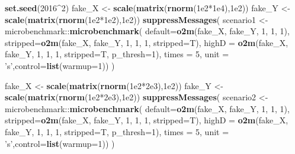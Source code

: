 \documentclass[]{article}
\newenvironment{Shaded}{\begin{snugshade}}{\end{snugshade}}
\newcommand{\KeywordTok}[1]{\textcolor[rgb]{0.13,0.29,0.53}{\textbf{{#1}}}}
\newcommand{\DataTypeTok}[1]{\textcolor[rgb]{0.13,0.29,0.53}{{#1}}}
\newcommand{\DecValTok}[1]{\textcolor[rgb]{0.00,0.00,0.81}{{#1}}}
\newcommand{\FloatTok}[1]{\textcolor[rgb]{0.00,0.00,0.81}{{#1}}}
\newcommand{\StringTok}[1]{\textcolor[rgb]{0.31,0.60,0.02}{{#1}}}
\newcommand{\NormalTok}[1]{{#1}}
\begin{document}
\begin{Shaded}
\begin{Highlighting}[]
\KeywordTok{set.seed}\NormalTok{(}\DecValTok{2016}\NormalTok{^}\DecValTok{2}\NormalTok{)}
\NormalTok{fake_X <-}\StringTok{ }\KeywordTok{scale}\NormalTok{(}\KeywordTok{matrix}\NormalTok{(}\KeywordTok{rnorm}\NormalTok{(}\FloatTok{1e2}\NormalTok{*}\FloatTok{1e4}\NormalTok{),}\FloatTok{1e2}\NormalTok{))}
\NormalTok{fake_Y <-}\StringTok{ }\KeywordTok{scale}\NormalTok{(}\KeywordTok{matrix}\NormalTok{(}\KeywordTok{rnorm}\NormalTok{(}\FloatTok{1e2}\NormalTok{*}\FloatTok{1e2}\NormalTok{),}\FloatTok{1e2}\NormalTok{))}
\KeywordTok{suppressMessages}\NormalTok{(}
  \NormalTok{scenario1 <-}\StringTok{ }\NormalTok{microbenchmark::}\KeywordTok{microbenchmark}\NormalTok{(}
    \DataTypeTok{default=}\KeywordTok{o2m}\NormalTok{(fake_X, fake_Y, }\DecValTok{1}\NormalTok{, }\DecValTok{1}\NormalTok{, }\DecValTok{1}\NormalTok{),}
    \DataTypeTok{stripped=}\KeywordTok{o2m}\NormalTok{(fake_X, fake_Y, }\DecValTok{1}\NormalTok{, }\DecValTok{1}\NormalTok{, }\DecValTok{1}\NormalTok{, }\DataTypeTok{stripped=}\NormalTok{T),}
    \DataTypeTok{highD =} \KeywordTok{o2m}\NormalTok{(fake_X, fake_Y, }\DecValTok{1}\NormalTok{, }\DecValTok{1}\NormalTok{, }\DecValTok{1}\NormalTok{, }\DataTypeTok{stripped=}\NormalTok{T, }\DataTypeTok{p_thresh=}\DecValTok{1}\NormalTok{),}
    \DataTypeTok{times =} \DecValTok{5}\NormalTok{, }\DataTypeTok{unit =} \StringTok{'s'}\NormalTok{,}\DataTypeTok{control=}\KeywordTok{list}\NormalTok{(}\DataTypeTok{warmup=}\DecValTok{1}\NormalTok{))}
\NormalTok{)}

\NormalTok{fake_X <-}\StringTok{ }\KeywordTok{scale}\NormalTok{(}\KeywordTok{matrix}\NormalTok{(}\KeywordTok{rnorm}\NormalTok{(}\FloatTok{1e2}\NormalTok{*}\FloatTok{2e3}\NormalTok{),}\FloatTok{1e2}\NormalTok{))}
\NormalTok{fake_Y <-}\StringTok{ }\KeywordTok{scale}\NormalTok{(}\KeywordTok{matrix}\NormalTok{(}\KeywordTok{rnorm}\NormalTok{(}\FloatTok{1e2}\NormalTok{*}\FloatTok{2e3}\NormalTok{),}\FloatTok{1e2}\NormalTok{))}
\KeywordTok{suppressMessages}\NormalTok{(}
  \NormalTok{scenario2 <-}\StringTok{ }\NormalTok{microbenchmark::}\KeywordTok{microbenchmark}\NormalTok{(}
    \DataTypeTok{default=}\KeywordTok{o2m}\NormalTok{(fake_X, fake_Y, }\DecValTok{1}\NormalTok{, }\DecValTok{1}\NormalTok{, }\DecValTok{1}\NormalTok{),}
    \DataTypeTok{stripped=}\KeywordTok{o2m}\NormalTok{(fake_X, fake_Y, }\DecValTok{1}\NormalTok{, }\DecValTok{1}\NormalTok{, }\DecValTok{1}\NormalTok{, }\DataTypeTok{stripped=}\NormalTok{T),}
    \DataTypeTok{highD =} \KeywordTok{o2m}\NormalTok{(fake_X, fake_Y, }\DecValTok{1}\NormalTok{, }\DecValTok{1}\NormalTok{, }\DecValTok{1}\NormalTok{, }\DataTypeTok{stripped=}\NormalTok{T, }\DataTypeTok{p_thresh=}\DecValTok{1}\NormalTok{),}
    \DataTypeTok{times =} \DecValTok{5}\NormalTok{, }\DataTypeTok{unit =} \StringTok{'s'}\NormalTok{,}\DataTypeTok{control=}\KeywordTok{list}\NormalTok{(}\DataTypeTok{warmup=}\DecValTok{1}\NormalTok{))}
\NormalTok{)}


\end{Highlighting}
\end{Shaded}
\end{document}
